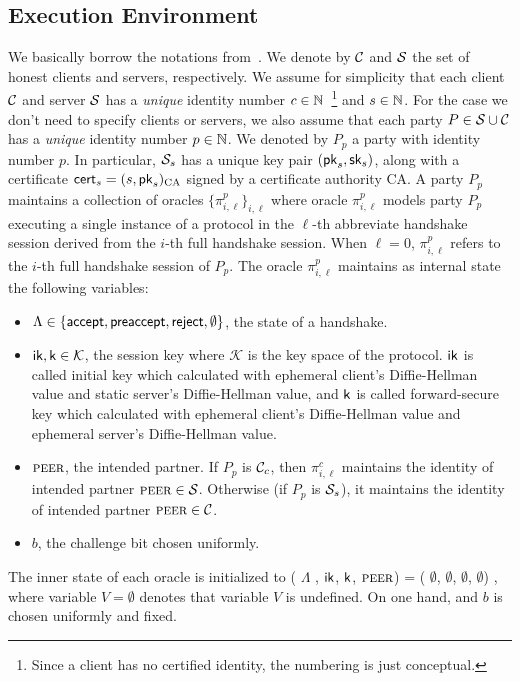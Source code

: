 \subsection{Execution Environment} \label{sec:exec_env_party}
We basically borrow the notations from~\cite{JKSS12:ACCE,KPW13:SACCE}.
We denote by $\mathcal{C}$ and $\mathcal{S}$ the set of honest clients and servers, respectively.
We assume for simplicity that each client $\mathcal{C}$ and server $\mathcal{S}$ has a \textit{unique} identity number $c \in \mathbb{N}$~\footnote{Since a client has
no certified identity, the numbering is just conceptual.}
and $s \in \mathbb{N}$.
For the case we don't need to specify clients or servers, we also assume that each party $P \in \mathcal{S} \cup \mathcal{C}$ has a \textit{unique} identity number $p \in \mathbb{N}$.
We denoted by $P_p$ a party with identity number $p$.
In particular, $\mathcal{S}_s$ has a unique key pair $(\mathsf{pk}_s, \mathsf{sk}_s)$, along with a certificate $\mathsf{cert}_s=(s,\mathsf{pk}_s)_{\text{CA}}$
signed by a certificate authority CA.
A party $P_p$ maintains a collection of oracles $\{\pi^p_{i,\ell }\}_{i,\ell}$
where oracle $\pi^p_{i, \ell}$ models party $P_p$ executing a single instance of a protocol in the $\ell$-th abbreviate handshake session
derived from  the $i$-th full handshake session.
When $\ell=0$, $\pi^p_{i,\ell}$ refers to the $i$-th full handshake session of $P_p$.
The oracle $\pi^p_{i, \ell}$ maintains as internal state the following variables:

\begin{itemize}
 \item{$\Lambda \in \{\mathsf{accept}, \mathsf{preaccept}, \mathsf{reject}, \emptyset\}$, the state of a handshake.}
 \item{$\mathsf{ik}, \mathsf{k} \in \mathcal{K}$, the session key where $\mathcal{K}$ is the key space of the protocol. $\mathsf{ik}$ is called initial key which calculated with ephemeral client's Diffie-Hellman value and static server's Diffie-Hellman value, and $\mathsf{k}$ is called forward-secure key which calculated with ephemeral client's Diffie-Hellman value and ephemeral server's Diffie-Hellman value.}
 \item{$\textsc{peer}$, the intended partner. If $P_p$ is $\mathcal{C}_c$, then $\pi^c_{i,\ell}$ maintains the identity of intended partner $\textsc{peer} \in \mathcal{S}$. Otherwise (if $P_p$ is $\mathcal{S}_s$), it maintains the identity of intended partner $\textsc{peer} \in \mathcal{C}$.}
 \item{$b$, the challenge bit chosen uniformly.}
\end{itemize}
The inner state of each oracle is initialized to
 ( $\Lambda$ , $\mathsf{ik}$, $\mathsf{k}$, $\textsc{peer}$) = ( $\emptyset$, $\emptyset$, $\emptyset$, $\emptyset$) ,
where variable $V=\emptyset$ denotes that variable $V$ is undefined.
On one hand, and
$b$ is chosen uniformly and fixed.

